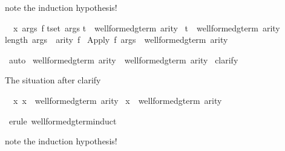 \begin{isabellebody}
%
\begin{isamarkuptxt}%
note the induction hypothesis!
\begin{isabelle}%
\ {}{\isachardot}\ {\isasymAnd}x\ args\ f{\isachardot}\isanewline
{}t{\isasymin}set\ args{\isachardot}\isanewline
{}t\ {\isasymin}\ well{\isacharunderscore}formed{\isacharunderscore}gterm\ arity\ {\isasymand}\isanewline
{}t\ {\isasymin}\ well{\isacharunderscore}formed{\isacharunderscore}gterm{\isacharprime}\ arity{\isacharsemicolon}\isanewline
{}length\ args\ {\isacharequal}\ arity\ f{\isasymrbrakk}\isanewline
{}\ Apply\ f\ args\ {\isasymin}\ well{\isacharunderscore}formed{\isacharunderscore}gterm{\isacharprime}\ arity%
\end{isabelle}%
\end{isamarkuptxt}%
\isamarkupfalse%
\ auto\isanewline
\isamarkupfalse%
%
\endisatagproof
{\isafoldproof}%
%
\isadelimproof
\isanewline
%
\endisadelimproof
\isanewline
\isanewline
\isanewline
\isamarkupfalse%
\ {\isachardoublequote}well{\isacharunderscore}formed{\isacharunderscore}gterm{\isacharprime}\ arity\ {\isasymsubseteq}\ well{\isacharunderscore}formed{\isacharunderscore}gterm\ arity{\isachardoublequote}\isanewline
%
\isadelimproof
%
\endisadelimproof
%
\isatagproof
\isamarkupfalse%
\ clarify\isamarkuptrue%
%
\begin{isamarkuptxt}%
The situation after clarify
\begin{isabelle}%
\ {}{\isachardot}\ {\isasymAnd}x{\isachardot}\ x\ {\isasymin}\ well{\isacharunderscore}formed{\isacharunderscore}gterm{\isacharprime}\ arity\ {\isasymLongrightarrow}\isanewline
{}x\ {\isasymin}\ well{\isacharunderscore}formed{\isacharunderscore}gterm\ arity%
\end{isabelle}%
\end{isamarkuptxt}%
\isamarkupfalse%
\ {\isacharparenleft}erule\ well{\isacharunderscore}formed{\isacharunderscore}gterm{\isacharprime}{\isachardot}induct{\isacharparenright}\isamarkuptrue%
%
\begin{isamarkuptxt}%
note the induction hypothesis!
\begin{isabelle}%

\end{isabelle}
\end{isamarkuptxt}
\end{isabellebody}
